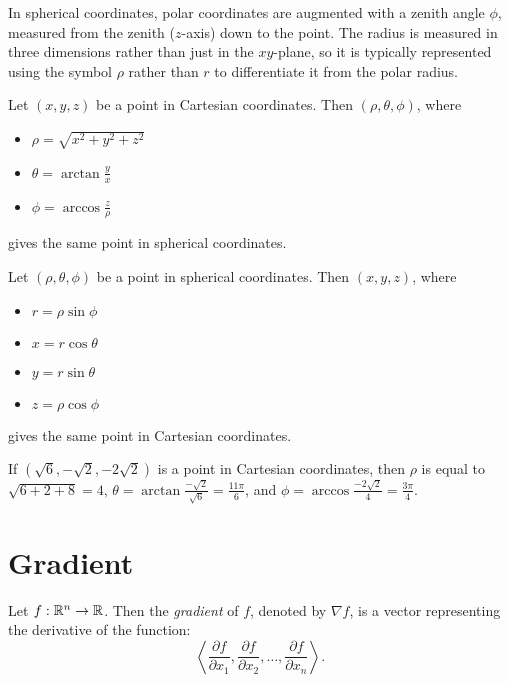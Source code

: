 In spherical coordinates, polar coordinates are augmented with a zenith angle $\phi$, measured from the zenith ($z$-axis) down to the point. The radius is measured in three dimensions rather than just in the $xy$-plane, so it is typically represented using the symbol $\rho$ rather than $r$ to differentiate it from the polar radius.

\begin{thm}
    Let $(x, y, z)$ be a point in Cartesian coordinates. Then $(\rho, \theta, \phi)$, where
    \begin{itemize}
        \item $\rho = \sqrt{x^2 + y^2 + z^2}$
        \item $\theta = \arctan\frac{y}{x}$
        \item $\phi = \arccos\frac{z}{\rho}$
    \end{itemize} gives the same point in spherical coordinates.
\end{thm}

\begin{thm}
    Let $(\rho, \theta, \phi)$ be a point in spherical coordinates. Then $(x, y, z)$, where
    \begin{itemize}
        \item $r = \rho\sin\phi$
        \item $x = r\cos\theta$
        \item $y = r\sin\theta$
        \item $z = \rho\cos\phi$
    \end{itemize} gives the same point in Cartesian coordinates.
\end{thm}

\begin{exmp}
    If $(\sqrt{6}, -\sqrt{2}, -2\sqrt{2})$ is a point in Cartesian coordinates, then $\rho$ is equal to $\sqrt{6 + 2 + 8} = 4$, $\theta = \arctan\frac{-\sqrt{2}}{\sqrt{6}} = \frac{11\pi}{6}$, and $\phi = \arccos\frac{-2\sqrt{2}}{4} = \frac{3\pi}{4}$.
\end{exmp}

\section{Gradient}

\begin{defn}
    Let $f: \mathbb{R}^n \to \mathbb{R}$. Then the \emph{gradient} of $f$, denoted by $\nabla f$, is a vector representing the derivative of the function: \[\left\langle \frac{\partial f}{\partial x_1}, \frac{\partial f}{\partial x_2}, \ldots, \frac{\partial f}{\partial x_n} \right\rangle.\]
\end{defn}


